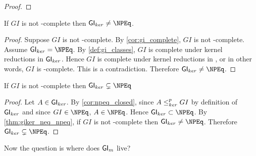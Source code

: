 \begin{lemma}\end{lemma}
\begin{proof}\end{proof}

\begin{theorem}\label{thm:giker_neq_npeq}If $GI$ is not \NP-complete then
  $\GIker\neq\NPEq$.\end{theorem}
\begin{proof}
  Suppose $GI$ is not \NP-complete. By \autoref{cor:gi_complete}, $GI$ is not
  \NPEq-complete. Assume $\GIker=\NPEq$. By \autoref{def:gi_classes}, $GI$ is
  complete under kernel reductions in ${\mathsf{GI}}_{ker}$. Hence $GI$ is complete under
  kernel reductions in \NPEq, or in other words, $GI$ is \NPEq-complete. This
  is a contradiction. Therefore $\GIker\neq\NPEq$.
\end{proof}

\begin{theorem}If $GI$ is not \NP-complete then
  $\GIker\subsetneq\NPEq$\end{theorem}
\begin{proof}Let $A\in{\ensuremath{\mathsf{GI}}}_{ker}$. By \autoref{cor:npeq_closed}, since $A\leq^{p}_{ker}
  GI$ by definition of ${\mathsf{GI}}_{ker}$ and since $GI\in\NPEq$, $A\in\NPEq$. Hence
  $\GIker\subset\NPEq$. By \autoref{thm:giker_neq_npeq}, if $GI$ is not
  \NP-complete then $\GIker\neq\NPEq$. Therefore
  $\GIker\subsetneq\NPEq$.\end{proof}

Now the question is where does ${\mathsf{GI}}_m$ live?